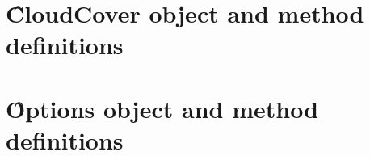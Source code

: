 \section{\f{CloudCover} object and method definitions}
\label{sec:cloudcover_object}


\clearpage
















\newpage
\section{\f{Options} object and method definitions}
\label{sec:options_object}


\clearpage



